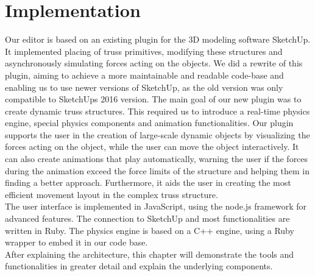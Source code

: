\chapter{Implementation}\label{ch:implementation}
Our editor is based on an existing plugin for the 3D modeling software SketchUp. It implemented placing of truss primitives, modifying these structures and asynchronously simulating forces acting on the objects. We did a rewrite of this plugin, aiming to achieve a more maintainable and readable code-base and enabling us to use newer versions of SketchUp, as the old version was only compatible to SketchUps 2016 version. The main goal of our new plugin was to create dynamic truss structures. This required us to introduce a real-time physics engine, special physics components and animation functionalities. Our plugin supports the user in the creation of large-scale dynamic objects by visualizing the forces acting on the object, while the user can move the object interactively. It can also create animations that play automatically, warning the user if the forces during the animation exceed the force limits of the structure and helping them in finding a better approach. Furthermore, it aids the user in creating the most efficient movement layout in the complex truss structure.\\
The user interface is implemented in JavaScript, using the node.js framework for advanced features. The connection to SketchUp and most functionalities are written in Ruby. The physics engine is based on a C++ engine, using a Ruby wrapper to embed it in our code base.\\
After explaining the architecture, this chapter will demonstrate the tools and functionalities in greater detail and explain the underlying components.

